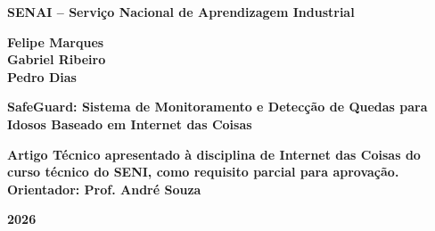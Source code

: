 \documentclass[a4paper,12pt]{article}
\begin{document}
\begin{titlepage}
\centering

\vspace*{2cm}

{\large\textbf{SENAI -- Serviço Nacional de Aprendizagem Industrial}}

\vspace{1.5cm}

{\Large\textbf{Felipe Marques\\[0.3em] Gabriel Ribeiro\\[0.3em] Pedro Dias}}

\vspace{3cm}

{\Large\textbf{SafeGuard: Sistema de Monitoramento e Detecção de Quedas para Idosos Baseado em Internet das Coisas}}

\vspace{2cm}

{\large\textbf{Artigo Técnico apresentado à disciplina de Internet das Coisas do curso técnico do SENI, como requisito parcial para aprovação.\\[1em] Orientador: Prof. André Souza}}

\vfill

{\large\textbf{2026}}

\end{titlepage}

\newpage

\end{document}
